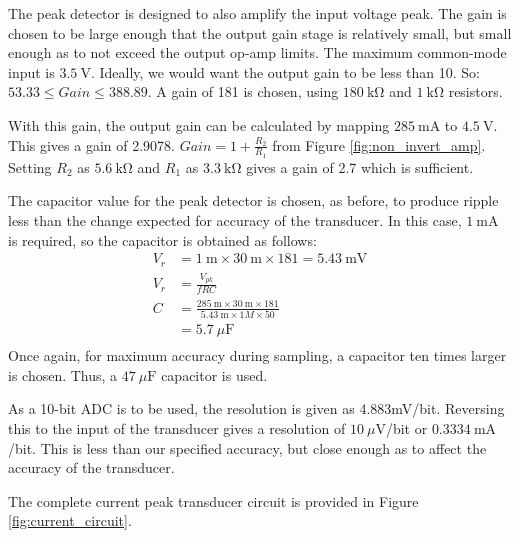 The peak detector is designed to also amplify the input voltage peak. The gain is chosen to be large enough that the output gain stage is relatively small, but small enough as to not exceed the output op-amp limits. The maximum common-mode input is $\SI{3.5}{\volt}$. Ideally, we would want the output gain to be less than 10. So: $53.33 \leq Gain \leq 388.89$. A gain of 181 is chosen, using $\SI{180}{\kilo\ohm}$ and $\SI{1}{\kilo\ohm}$ resistors.

With this gain, the output gain can be calculated by mapping $\SI{285}{\milli\ampere}$ to $\SI{4.5}{\volt}$. This gives a gain of 2.9078. $Gain = 1 + \frac{R_2}{R_1}$ from Figure \ref{fig:non_invert_amp}. Setting $R_2$ as $\SI{5.6}{\kilo\ohm}$ and $R_1$ as $\SI{3.3}{\kilo\ohm}$ gives a gain of 2.7 which is sufficient.

The capacitor value for the peak detector is chosen, as before, to produce ripple less than the change expected for accuracy of the transducer. In this case, $\SI{1}{\milli\ampere}$ is required, so the capacitor is obtained as follows\cite{Neamen:Microelectronics}:
\begin{equation}
\begin{split}
    V_r &= \SI{1}{\milli} \times \SI{30}{\milli} \times 181 = \SI{5.43}{\milli\volt} \\
    V_r &= \frac{V_{pk}}{fRC} \\
    C &= \frac{\SI{285}{\milli} \times \SI{30}{\milli} \times 181}{\SI{5.43}{\milli} \times 1M \times 50} \\
    &= \SI{5.7}{\mu\farad} \\
\end{split}
\end{equation}
Once again, for maximum accuracy during sampling, a capacitor ten times larger is chosen. Thus, a $\SI{47}{\mu\farad}$ capacitor is used.

As a 10-bit ADC is to be used, the resolution is given as 4.883mV/bit. Reversing this to the input of the transducer gives a resolution of $\SI{10}{\mu\volt}$/bit or $\SI{0.3334}{\milli\ampere}$/bit. This is less than our specified accuracy, but close enough as to affect the accuracy of the transducer.

The complete current peak transducer circuit is provided in Figure \ref{fig:current_circuit}.

